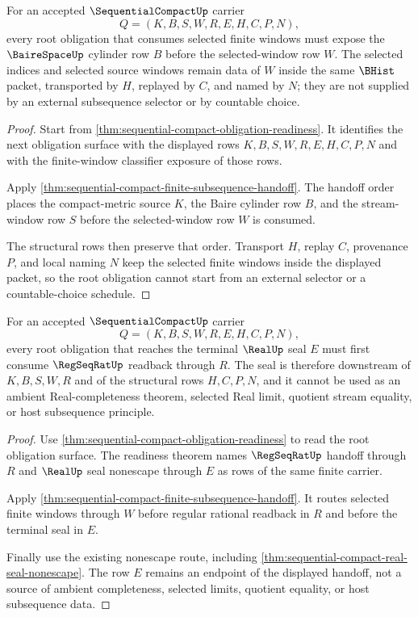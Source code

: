 \begin{theorem}
\label{thm:sequential-compact-root-obligation-baire-window}
For an accepted $\SequentialCompactUp$ carrier
$$
Q=(K,B,S,W,R,E,H,C,P,N),
$$
every root obligation that consumes selected finite windows must expose the $\BaireSpaceUp$ cylinder row $B$ before the selected-window row $W$. The selected indices and selected source windows remain data of $W$ inside the same $\BHist$ packet, transported by $H$, replayed by $C$, and named by $N$; they are not supplied by an external subsequence selector or by countable choice.
\end{theorem}
\begin{proof}
Start from \autoref{thm:sequential-compact-obligation-readiness}. It identifies the next obligation surface with the displayed rows $K,B,S,W,R,E,H,C,P,N$ and with the finite-window classifier exposure of those rows.

Apply \autoref{thm:sequential-compact-finite-subsequence-handoff}. The handoff order places the compact-metric source $K$, the Baire cylinder row $B$, and the stream-window row $S$ before the selected-window row $W$ is consumed.

The structural rows then preserve that order. Transport $H$, replay $C$, provenance $P$, and local naming $N$ keep the selected finite windows inside the displayed packet, so the root obligation cannot start from an external selector or a countable-choice schedule.
\end{proof}

\begin{theorem}
\label{thm:sequential-compact-root-obligation-real-seal}
For an accepted $\SequentialCompactUp$ carrier
$$
Q=(K,B,S,W,R,E,H,C,P,N),
$$
every root obligation that reaches the terminal $\RealUp$ seal $E$ must first consume $\RegSeqRatUp$ readback through $R$. The seal is therefore downstream of $K,B,S,W,R$ and of the structural rows $H,C,P,N$, and it cannot be used as an ambient Real-completeness theorem, selected Real limit, quotient stream equality, or host subsequence principle.
\end{theorem}
\begin{proof}
Use \autoref{thm:sequential-compact-obligation-readiness} to read the root obligation surface. The readiness theorem names $\RegSeqRatUp$ handoff through $R$ and $\RealUp$ seal nonescape through $E$ as rows of the same finite carrier.

Apply \autoref{thm:sequential-compact-finite-subsequence-handoff}. It routes selected finite windows through $W$ before regular rational readback in $R$ and before the terminal seal in $E$.

Finally use the existing nonescape route, including \autoref{thm:sequential-compact-real-seal-nonescape}. The row $E$ remains an endpoint of the displayed handoff, not a source of ambient completeness, selected limits, quotient equality, or host subsequence data.
\end{proof}

